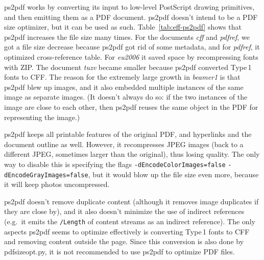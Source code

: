 \documentclass{ltugproc}
\def\cmd{\textsf}
\newcommand\DD{\discretionary{\the \textfont 1\char"2E}{}{}}
\begin{document}
\cmd{ps2pdf} works by converting its input to low-level PostScript drawing
primitives, and then emitting them as a PDF document. \cmd{ps2pdf} doesn't
intend to be a PDF size optimizer, but it can be used as such.
Table~\ref{tab:eff-ps2pdf} shows that \cmd{ps2pdf} increases the file size
many times. For the documents \emph{cff} and \emph{pdfref}, we got a file
size decrease because \cmd{ps2pdf} got rid of some metadata, and for
\emph{pdfref}, it optimized cross-reference table. For \emph{eu2006} it
saved space by recompressing fonts with ZIP. The document \emph{tuzv} became
smaller because \cmd{ps2pdf} converted Type\,1 fonts to CFF. The reason for
the extremely large growth in \emph{beamer1} is that \cmd{ps2pdf} blew up
images, and it also embedded multiple instances of the same image as
separate images. (It doesn't always do so: if the two instances of the image
are close to each other, then \cmd{ps2pdf} reuses the same object in the PDF
for representing the image.)

\cmd{ps2pdf} keeps all printable features of the original PDF, and
hyperlinks and the document outline as well. However, it recompresses JPEG
images (back to a different JPEG, sometimes larger than the original), thus
losing quality. The only way to disable this is specifying the flags
\texttt{-dEncodeColor\DD Images=false} \texttt{-dEncodeGrayImages=false}, but
it would
blow up the file size even more, because it will keep photos uncompressed.

\cmd{ps2pdf} doesn't remove duplicate content (although it
removes image duplicates if they are close by), and it also doesn't minimize
the use of indirect references (e.g.\ it emits the \texttt{/Length} of
content streams as an indirect reference). The only aspects \cmd{ps2pdf}
seems to optimize effectively is converting Type\,1 fonts to CFF and
removing content outside the page. Since this
conversion is also done by \cmd{pdfsizeopt.py}, it is
not recommended to use \cmd{ps2pdf} to optimize PDF files.
\end{document}
